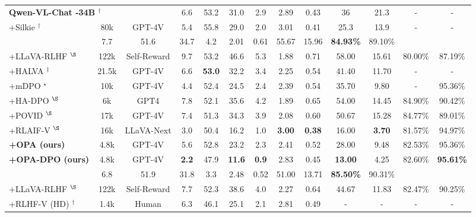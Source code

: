 \begin{table}[t]
{\begin{tabular}{lcc|cccccccccc}
\multicolumn{3}{l|}{\textbf{Qwen-VL-Chat -34B \cite{bai2023qwenvl}$^\dagger$}} & 6.6 & 53.2 & 31.0 & 2.9 & 2.89 & 0.43 & 36 & 21.3 & - & - \\
+Silkie \cite{li2023silkie}$^\dagger$ & 80k & GPT-4V & 5.4 & 55.8 & 29.0 & 2.0 & 3.01 & 0.41 & 25.3 & 13.9 & - & - \\ \addlinespace \hline \addlinespace
\multicolumn{3}{l|}{\textbf{LLaVA-Instruct-1.5-7B \cite{liu2024llava, liu2024llava2}$^\S$}} & 7.7 & 51.6 & 34.7 & 4.2 & 2.01 & 0.61 & 55.67 & 15.96 & \textbf{84.93\%} & 89.10\% \\
+LLaVA-RLHF \cite{sun2023llava_rlhf}$^\S$ & 122k & Self-Reward & 9.7 & 53.2 & 46.6 & 5.3 & 1.88 & 0.71 & 58.00 & 15.61 & 80.00\% & 87.19\% \\
+HALVA \cite{sarkar2024halva}$^\ddagger$ & 21.5k & GPT-4V & 6.6 & \textbf{53.0} & 32.2 & 3.4 & 2.25 & 0.54 & 41.40 & 11.70 & - & - \\
+mDPO \cite{wang2024mdpo}$^\star$ & 10k & GPT-4V & 4.4 & 52.4 & 24.5 & 2.4 & 2.39 & 0.54 & 35.70 & 9.80 & - & 95.36\% \\
+HA-DPO \cite{zhao2023hadpo}$^\S$ & 6k & GPT4 & 7.8 & 52.1 & 35.6 & 4.2 & 1.89 & 0.65 & 54.00 & 14.45 & 84.90\% & 90.42\% \\
+POVID \cite{zhou2024povid}$^\S$ & 17k & GPT-4V & 7.4 & 51.3 & 34.3 & 3.9 & 2.08 & 0.60 & 50.67 & 15.28 & 84.77\% & 89.01\% \\
+RLAIF-V \cite{yu2024rlaif}$^\S$ & 16k & LLaVA-Next & 3.0 & 50.4 & 16.2 & 1.0 & \textbf{3.00} & \textbf{0.38} & 16.00 & \textbf{3.70} & 81.57\% & 94.97\% \\
\rowcolor[HTML]{ECF4FF}
\textbf{+OPA (ours)} & 4.8k & GPT-4V & 5.6 & 52.8 & 23.2 & 2.3 & 2.41 & 0.52 & 28.00 & 9.48 & 82.53\% & 95.36\% \\
\rowcolor[HTML]{ECF4FF}
\textbf{+OPA-DPO (ours)} & 4.8k & GPT-4V & \textbf{2.2} & 47.9 & \textbf{11.6} & \textbf{0.9} & 2.83 & 0.45 & \textbf{13.00} & 4.25 & 82.60\% & \textbf{95.61\%} \\ \addlinespace \hline \addlinespace
\multicolumn{3}{l|}{\textbf{LLaVA-Instruct-1.5-13B \cite{liu2024llava, liu2024llava2}$^\S$}} & 6.8 & 51.9 & 31.8 & 3.3 & 2.48 & 0.52 & 51.00 & 13.71 & \textbf{85.50\%} & 90.31\% \\
+LLaVA-RLHF \cite{sun2023llava_rlhf}$^\S$ & 122k & Self-Reward & 7.7 & 52.3 & 38.6 & 4.0 & 2.27 & 0.64 & 44.67 & 11.83 & 82.47\% & 90.25\% \\
+RLHF-V (HD) \cite{yu2024rlhfv}$^\dagger$ & 1.4k & Human & 6.3 & 46.1 & 25.1 & 2.1 & 2.81 & 0.49 & - & - & - & - \\

\end{tabular}}
\end{table}
